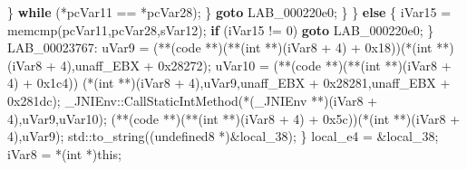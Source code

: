 \documentclass[
]{article}
\newenvironment{Shaded}{}{}
\newcommand{\BaseNTok}[1]{\textcolor[rgb]{0.25,0.63,0.44}{#1}}
\newcommand{\ControlFlowTok}[1]{\textcolor[rgb]{0.00,0.44,0.13}{\textbf{#1}}}
\newcommand{\DataTypeTok}[1]{\textcolor[rgb]{0.56,0.13,0.00}{#1}}
\newcommand{\DecValTok}[1]{\textcolor[rgb]{0.25,0.63,0.44}{#1}}
\newcommand{\NormalTok}[1]{#1}
\newcommand{\OperatorTok}[1]{\textcolor[rgb]{0.40,0.40,0.40}{#1}}
\begin{document}
\begin{Shaded}
\begin{Highlighting}[]
          \OperatorTok{\}} \ControlFlowTok{while} \OperatorTok{(*}\NormalTok{pcVar11 }\OperatorTok{==} \OperatorTok{*}\NormalTok{pcVar28}\OperatorTok{);}
        \OperatorTok{\}}
        \ControlFlowTok{goto}\NormalTok{ LAB\_000220e0}\OperatorTok{;}
      \OperatorTok{\}}
    \OperatorTok{\}}
    \ControlFlowTok{else} \OperatorTok{\{}
\NormalTok{      iVar15 }\OperatorTok{=}\NormalTok{ memcmp}\OperatorTok{(}\NormalTok{pcVar11}\OperatorTok{,}\NormalTok{pcVar28}\OperatorTok{,}\NormalTok{sVar12}\OperatorTok{);}
      \ControlFlowTok{if} \OperatorTok{(}\NormalTok{iVar15 }\OperatorTok{!=} \DecValTok{0}\OperatorTok{)} \ControlFlowTok{goto}\NormalTok{ LAB\_000220e0}\OperatorTok{;}
    \OperatorTok{\}}
\NormalTok{LAB\_00023767}\OperatorTok{:}
\NormalTok{    uVar9 }\OperatorTok{=} \OperatorTok{(**(}\NormalTok{code }\OperatorTok{**)(**(}\DataTypeTok{int} \OperatorTok{**)(}\NormalTok{iVar8 }\OperatorTok{+} \DecValTok{4}\OperatorTok{)} \OperatorTok{+} \BaseNTok{0x18}\OperatorTok{))(*(}\DataTypeTok{int} \OperatorTok{**)(}\NormalTok{iVar8 }\OperatorTok{+} \DecValTok{4}\OperatorTok{),}\NormalTok{unaff\_EBX }\OperatorTok{+} \BaseNTok{0x28272}\OperatorTok{);}
\NormalTok{    uVar10 }\OperatorTok{=} \OperatorTok{(**(}\NormalTok{code }\OperatorTok{**)(**(}\DataTypeTok{int} \OperatorTok{**)(}\NormalTok{iVar8 }\OperatorTok{+} \DecValTok{4}\OperatorTok{)} \OperatorTok{+} \BaseNTok{0x1c4}\OperatorTok{))}
                       \OperatorTok{(*(}\DataTypeTok{int} \OperatorTok{**)(}\NormalTok{iVar8 }\OperatorTok{+} \DecValTok{4}\OperatorTok{),}\NormalTok{uVar9}\OperatorTok{,}\NormalTok{unaff\_EBX }\OperatorTok{+} \BaseNTok{0x28281}\OperatorTok{,}\NormalTok{unaff\_EBX }\OperatorTok{+} \BaseNTok{0x281dc}\OperatorTok{);}
\NormalTok{    \_JNIEnv}\OperatorTok{::}\NormalTok{CallStaticIntMethod}\OperatorTok{(*(}\NormalTok{\_JNIEnv }\OperatorTok{**)(}\NormalTok{iVar8 }\OperatorTok{+} \DecValTok{4}\OperatorTok{),}\NormalTok{uVar9}\OperatorTok{,}\NormalTok{uVar10}\OperatorTok{);}
    \OperatorTok{(**(}\NormalTok{code }\OperatorTok{**)(**(}\DataTypeTok{int} \OperatorTok{**)(}\NormalTok{iVar8 }\OperatorTok{+} \DecValTok{4}\OperatorTok{)} \OperatorTok{+} \BaseNTok{0x5c}\OperatorTok{))(*(}\DataTypeTok{int} \OperatorTok{**)(}\NormalTok{iVar8 }\OperatorTok{+} \DecValTok{4}\OperatorTok{),}\NormalTok{uVar9}\OperatorTok{);}
\NormalTok{    std}\OperatorTok{::}\NormalTok{to\_string}\OperatorTok{((}\NormalTok{undefined8 }\OperatorTok{*)\&}\NormalTok{local\_38}\OperatorTok{);}
  \OperatorTok{\}}
\NormalTok{  local\_e4 }\OperatorTok{=} \OperatorTok{\&}\NormalTok{local\_38}\OperatorTok{;}
\NormalTok{  iVar8 }\OperatorTok{=} \OperatorTok{*(}\DataTypeTok{int} \OperatorTok{*)}\NormalTok{this}\OperatorTok{;}

\end{Highlighting}
\end{Shaded}
\end{document}

